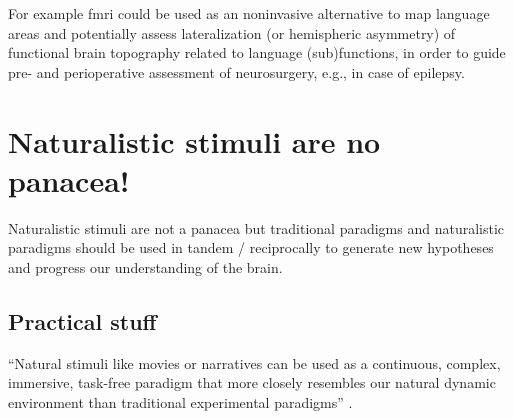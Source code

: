 
%
For example \ac{fmri} could be used as an noninvasive alternative to map
language areas and potentially assess lateralization (or hemispheric asymmetry)
of functional brain topography related to language (sub)functions, in order to
guide pre- and perioperative assessment of neurosurgery, e.g., in case of
epilepsy.






\section{Naturalistic stimuli are no panacea!}

%
Naturalistic stimuli are not a panacea but traditional paradigms and
naturalistic paradigms should be used in tandem / reciprocally to generate new
hypotheses and progress our understanding of the brain.



\subsection{Practical stuff}



``Natural stimuli like movies \citep{eickhoff2020towards,
hasson2008neurocinematics, sonkusare2019naturalistic} or narratives
\citep{hamilton2018revolution, honey2012not, lerner2011topographic,
silbert2014coupled, wilson2008beyond} can be used as a continuous, complex,
immersive, task-free paradigm that more closely resembles our natural dynamic
environment than traditional experimental paradigms''
\citep{haeusler2022processing}.

